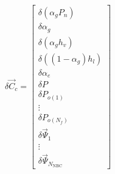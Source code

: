 \documentclass[compress,xcolor=table]{beamer}
\begin{document}
\begin{frame}[shrink=25]
\begin{columns}
\begin{equation*}
\delta \vec{C}_{c} =
\begin{bmatrix}
\delta ( \alpha_{g} P_{n} ) \\
\delta \alpha_{g} \\
\delta ( \alpha_{g} h_v ) \\
\delta ( (1 - \alpha_{g} ) h_l ) \\
\delta \alpha_{e} \\
\delta P \\ 
\delta P_{o(1)} \\
\vdots \\
\delta P_{o(N_{f})} \\
\delta \vec{\Psi}_{1} \\
\vdots \\
\delta \vec{\Psi}_{N_{\text{NBC}}}
\end{bmatrix}
\end{equation*}

\end{columns}

\end{frame}
\end{document}
